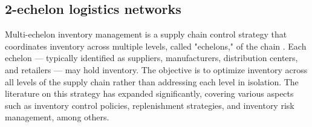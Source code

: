 \documentclass[ijoc,sglanonrev]{informs4}
\begin{document}

\subsection{2-echelon logistics networks}

Multi-echelon inventory management is a supply chain control strategy that coordinates inventory across multiple levels, called "echelons," of the chain \citep{Clark60}. Each echelon — typically identified as suppliers, manufacturers, distribution centers, and retailers — may hold inventory. The objective is to optimize inventory across all levels of the supply chain rather than addressing each level in isolation. The literature on this strategy has expanded significantly, covering various aspects such as inventory control policies, replenishment strategies, and inventory risk management, among others. 
\end{document}

